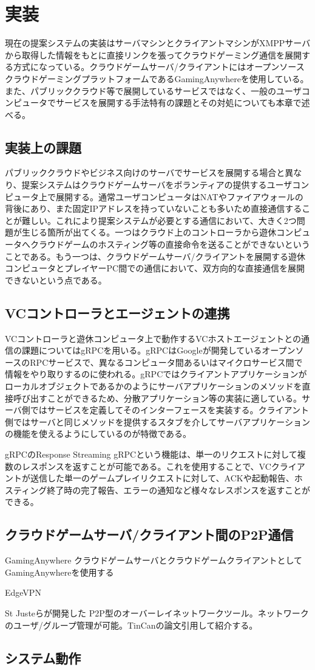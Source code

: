\section{実装}

現在の提案システムの実装はサーバマシンとクライアントマシンがXMPPサーバから取得した情報をもとに直接リンクを張ってクラウドゲーミング通信を展開する方式になっている。クラウドゲームサーバ/クライアントにはオープンソースクラウドゲーミングプラットフォームであるGamingAnywhereを使用している。また、パブリッククラウド等で展開しているサービスではなく、一般のユーザコンピュータでサービスを展開する手法特有の課題とその対処についても本章で述べる。

\subsection{実装上の課題}
パブリッククラウドやビジネス向けのサーバでサービスを展開する場合と異なり、提案システムはクラウドゲームサーバをボランティアの提供するユーザコンピュータ上で展開する。通常ユーザコンピュータはNATやファイアウォールの背後にあり、また固定IPアドレスを持っていないことも多いため直接通信することが難しい。これにより提案システムが必要とする通信において、大きく2つ問題が生じる箇所が出てくる。一つはクラウド上のコントローラから遊休コンピュータへクラウドゲームのホスティング等の直接命令を送ることができないということである。もう一つは、クラウドゲームサーバ/クライアントを展開する遊休コンピュータとプレイヤーPC間での通信において、双方向的な直接通信を展開できないという点である。

\subsection{VCコントローラとエージェントの連携}
VCコントローラと遊休コンピュータ上で動作するVCホストエージェントとの通信の課題についてはgRPC\cite{grpc}を用いる。gRPCはGoogleが開発しているオープンソースのRPCサービスで、異なるコンピュータ間あるいはマイクロサービス間で情報をやり取りするのに使われる。gRPCではクライアントアプリケーションがローカルオブジェクトであるかのようにサーバアプリケーションのメソッドを直接呼び出すことができるため、分散アプリケーション等の実装に適している。サーバ側ではサービスを定義してそのインターフェースを実装する。クライアント側ではサーバと同じメソッドを提供するスタブを介してサーバアプリケーションの機能を使えるようにしているのが特徴である。

gRPCのResponse Streaming gRPCという機能は、単一のリクエストに対して複数のレスポンスを返すことが可能である。これを使用することで、VCクライアントが送信した単一のゲームプレイリクエストに対して、ACKや起動報告、ホスティング終了時の完了報告、エラーの通知など様々なレスポンスを返すことができる。

\subsection{クラウドゲームサーバ/クライアント間のP2P通信}

GamingAnywhere
クラウドゲームサーバとクラウドゲームクライアントとしてGamingAnywhereを使用する

EdgeVPN
\cite{edgevpn}

St Justeら\cite{tincan}が開発した
P2P型のオーバーレイネットワークツール。ネットワークのユーザ/グループ管理が可能。TinCanの論文引用して紹介する。

\subsection{システム動作}

